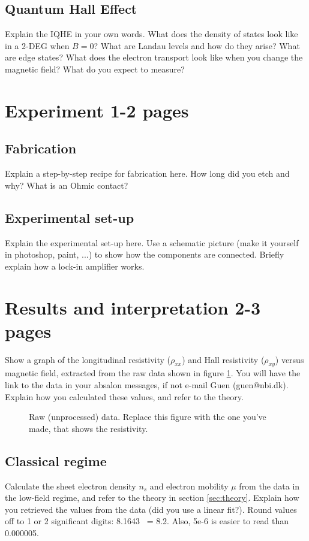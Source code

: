 \documentclass[a4paper]{article}
\begin{document}
\subsection{Quantum Hall Effect}
Explain the IQHE in your own words. What does the density of states look like in a 2-DEG when $B=0$? What are Landau levels and how do they arise? What are edge states? What does the electron transport look like when you change the magnetic field? What do you expect to measure?

\section{Experiment 1-2 pages}
\subsection{Fabrication}
Explain a step-by-step recipe for fabrication here. How long did you etch and why? What is an Ohmic contact?
\subsection{Experimental set-up}
Explain the experimental set-up here. Use a schematic picture (make it yourself in photoshop, paint, ...) to show how the components are connected. Briefly explain how a lock-in amplifier works.

\section{Results and interpretation 2-3 pages}
Show a graph of the longitudinal resistivity ($\rho_{xx}$) and Hall resistivity ($\rho_{xy}$) versus magnetic field, extracted from the raw data shown in figure \ref{fig:data}. You will have the link to the data in your absalon messages, if not e-mail Guen (guen@nbi.dk). Explain how you calculated these values, and refer to the theory.

\begin{figure}
\centering
\caption{\label{fig:data}Raw (unprocessed) data. Replace this figure with the one you've made, that shows the resistivity.}
\end{figure}

\subsection{Classical regime}
Calculate the sheet electron density $n_{s}$ and electron mobility $\mu$ from the data in the low-field regime, and refer to the theory in section \ref{sec:theory}. Explain how you retrieved the values from the data (did you use a linear fit?).
Round values off to 1 or 2 significant digits: 8.1643 ~= 8.2. Also, 5e-6 is easier to read than 0.000005.
\end{document}
